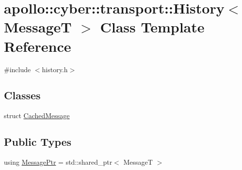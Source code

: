 \hypertarget{classapollo_1_1cyber_1_1transport_1_1History}{\section{apollo\-:\-:cyber\-:\-:transport\-:\-:History$<$ Message\-T $>$ Class Template Reference}
\label{classapollo_1_1cyber_1_1transport_1_1History}
}


{\ttfamily \#include $<$history.\-h$>$}

\subsection*{Classes}
\begin{DoxyCompactItemize}
\item 
struct \hyperlink{structapollo_1_1cyber_1_1transport_1_1History_1_1CachedMessage}{Cached\-Message}
\end{DoxyCompactItemize}
\subsection*{Public Types}
\begin{DoxyCompactItemize}
\item 
using \hyperlink{classapollo_1_1cyber_1_1transport_1_1History_a4c11720b1c1d14eafb9fec5436a0d7c0}{Message\-Ptr} = std\-::shared\-\_\-ptr$<$ Message\-T $>$
\end{DoxyCompactItemize}
